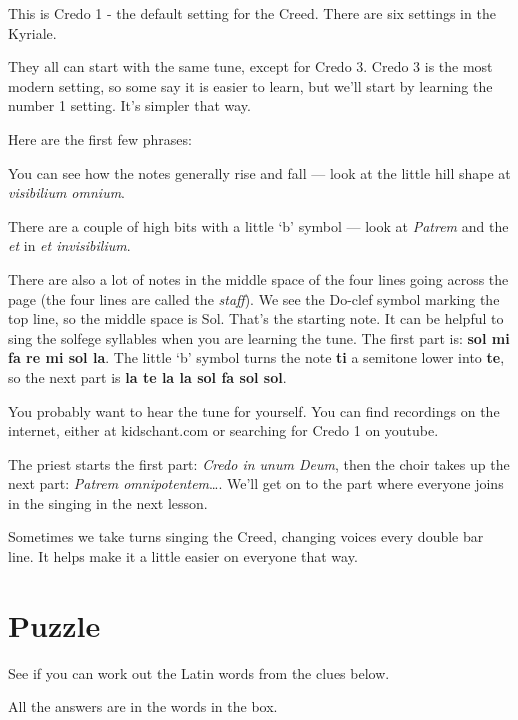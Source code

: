 \documentclass[12pt,a4paper]{article}
\begin{document}
This is Credo 1 - the default setting for the Creed.  There are six settings in the Kyriale.  

They all can start with the same tune, except for Credo 3.  Credo 3 is the most modern setting, so some say it is easier to learn, but we'll start by learning the number 1 setting.  It's simpler that way.

Here are the first few phrases:


You can see how the notes generally rise and fall --- look at the little hill shape at \emph{visibilium omnium}.

There are a couple of high bits with a little `b' symbol --- look at \emph{Patrem} and the \emph{et} in \emph{et invisibilium}.

There are also a lot of notes in the middle space of the four lines going across the page (the four lines are called the \emph{staff}).  We see the Do-clef symbol marking the top line, so the middle space is Sol.  That's the starting note.  It can be helpful to sing the solfege syllables when you are learning the tune.  The first part is: \textbf{sol mi fa re mi sol la}.  The little `b' symbol turns the note \textbf{ti} a semitone lower into \textbf{te}, so the next part is \textbf{la te la la sol fa sol sol}.

You probably want to hear the tune for yourself.  You can find recordings on the internet, either at kidschant.com or searching for Credo 1 on youtube.

The priest starts the first part: \emph{Credo in unum Deum}, then the choir takes up the next part: \emph{Patrem omnipotentem}\ldots.  We'll get on to the part where everyone joins in the singing in the next lesson.

Sometimes we take turns singing the Creed, changing voices every double bar line.  It helps make it a little easier on everyone that way.

\newpage

\section{Puzzle}

See if you can work out the Latin words from the clues below.

All the answers are in the words in the box.
\end{document}
